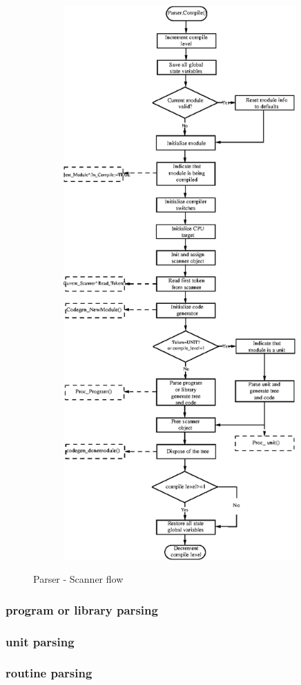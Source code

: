 \documentclass [a4paper,12pt]{article}
\begin{document}
\begin{figure}
\includegraphics[width=4.99in,height=8.36in]{arch8.eps}
\fi
\label{fig8}
\caption{Parser - Scanner flow}
\end{figure}

\subsubsection{program or library parsing }

\subsubsection{unit parsing }
\label{subsubsec:mylabel12}

\subsubsection{routine parsing }
\label{subsubsec:routine}
\end{document}

